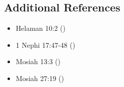 \documentclass[12pt]{report}
\begin{document}
\subsection{Additional References\label{1Nephi1:7:references}}
\begin{itemize}
\item Helaman 10:2 ()
\item 1 Nephi 17:47-48 ()
\item Mosiah 13:3 ()
\item Mosiah 27:19 ()
\end{itemize}
\printindex
\end{document}
